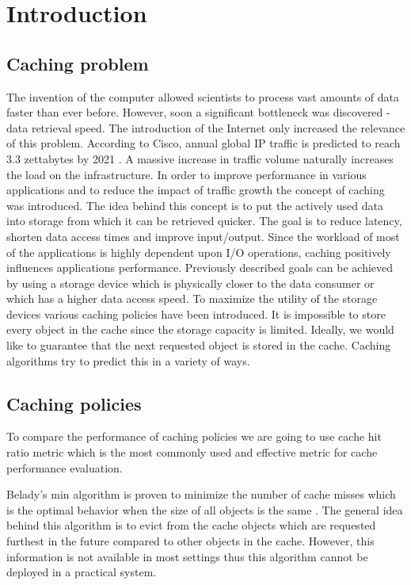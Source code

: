 \section{Introduction} \label{introduction}
\subsection{Caching problem} \label{caching_problem}

The invention of the computer allowed scientists to process vast amounts of data faster than ever before. However, soon a significant bottleneck was discovered - data retrieval speed. The introduction of the Internet only increased the relevance of this problem. According to Cisco, annual global IP traffic is predicted to reach 3.3 zettabytes by 2021 \cite{1}. A massive increase in traffic volume naturally increases the load on the infrastructure. In order to improve performance in various applications and to reduce the impact of traffic growth the concept of caching was introduced. The idea behind this concept is to put the actively used data into storage from which it can be retrieved quicker. The goal is to reduce latency, shorten data access times and improve input/output. Since the workload of most of the applications is highly dependent upon I/O operations, caching positively influences applications performance. Previously described goals can be achieved by using a storage device which is physically closer to the data consumer or which has a higher data access speed. To maximize the utility of the storage devices various caching policies have been introduced. It is impossible to store every object in the cache since the storage capacity is limited. Ideally, we would like to guarantee that the next requested object is stored in the cache. Caching algorithms try to predict this in a variety of ways.

\subsection{Caching policies} \label{caching_policies}

To compare the performance of caching policies we are going to use cache hit ratio \cite{5} metric which is the most commonly used and effective metric for cache performance evaluation.

Belady's min algorithm is proven to minimize the number of cache misses which is the optimal behavior when the size of all objects is the same \cite{2}. The general idea behind this algorithm is to evict from the cache objects which are requested furthest in the future compared to other objects in the cache. However, this information is not available in most settings thus this algorithm cannot be deployed in a practical system.

